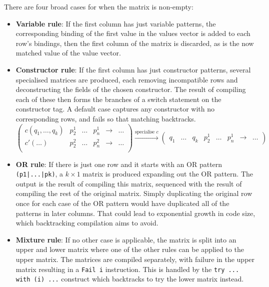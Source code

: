 There are four broad cases for when the matrix is non-empty:
\begin{itemize}
\item \textbf{Variable rule}: If the first column has just variable patterns, the corresponding binding of the first value in the values vector is added to each row's bindings, then the first column of the matrix is discarded, as is the now matched value of the value vector.
\item \textbf{Constructor rule}: If the first column has just constructor patterns, several specialised matrices are produced, each removing incompatible rows and deconstructing the fields of the chosen constructor. The result of compiling each of these then forms the branches of a switch statement on the constructor tag. A default case captures any constructor with no corresponding rows, and fails so that matching backtracks. \\
$
\begin{pmatrix}
c(q_1, \dots, q_k) & p^1_2 & \dots & p^1_n & \to & \dots \\
c'(\dots) & p^2_2 & \dots & p^2_n & \to & \dots \\
\end{pmatrix}
\xrightarrow{\text{specialise } c}
\begin{pmatrix}
 q_1 & \dots & q_k & p^1_2 & \dots & p^1_n  & \to & \dots 
\end{pmatrix}
$
\item \textbf{OR rule}: If there is just one row and it starts with an OR pattern \verb"(p1|...|pk)", a $k \times 1$ matrix is produced expanding out the OR pattern. %
The output is the result of compiling this matrix, sequenced with the result of compiling the rest of the original matrix. Simply duplicating the original row once for each case of the OR pattern would have duplicated all of the patterns in later columns. That could lead to exponential growth in code size, which backtracking compilation aims to avoid.
\item \textbf{Mixture rule}: If no other case is applicable, the matrix is split into an upper and lower matrix where one of the other rules can be applied to the upper matrix. The matrices are compiled separately, with failure in the upper matrix resulting in a \verb|Fail i| instruction. This is handled by the \verb|try ... with (i) ...| construct which backtracks to try the lower matrix instead.

\end{itemize}

